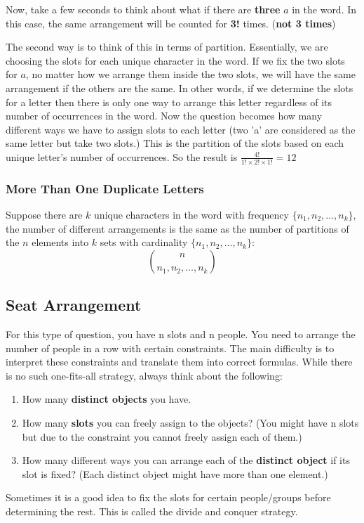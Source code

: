 \documentclass[11pt]{article}
\begin{document}
Now, take a few seconds to think about what if there are \textbf{three} $a$ in the word.
In this case, the same arrangement will be counted for \textbf{3!} times. (\textbf{not 3 times})

The second way is to think of this in terms of partition. Essentially, we are choosing the slots for each unique character in the word. 
If we fix the two slots for $a$, no matter how we arrange them inside the two slots, we will have the same arrangement if the others are the same.
In other words, if we determine the slots for a letter then there is only one way to arrange this letter regardless of its number of occurrences in the word. 
Now the question becomes how many different ways we have to assign slots to each letter (two 'a' are considered as the same letter but take two slots.)
This is the partition of the slots based on each unique letter's number of occurrences. So the result is $\frac{4!}{1! \times 2! \times 1!} = 12$ 

\subsubsection{More Than One Duplicate Letters}
Suppose there are $k$ unique characters in the word with frequency $\{n_1, n_2, \ldots,n_k\}$, the number of different arrangements is the same as the number of partitions of the $n$ elements into $k$ sets with cardinality $\{n_1, n_2, \ldots,n_k\}$:
$$ {n \choose n_1, n_2, \ldots, n_k} $$

\subsection{Seat Arrangement}
For this type of question, you have n slots and n people. 
You need to arrange the number of people in a row with certain constraints.
The main difficulty is to interpret these constraints and translate them into correct formulas. 
While there is no such one-fits-all strategy, always think about the following:
\begin{enumerate}
  \item How many \textbf{distinct objects} you have.
  \item How many \textbf{slots} you can freely assign to the objects? (You might have n slots but due to the constraint you cannot freely assign each of them.)
  \item How many different ways you can arrange each of the \textbf{distinct object} if its slot is fixed? (Each distinct object might have more than one element.)
\end{enumerate}
Sometimes it is a good idea to fix the slots for certain people/groups before determining the rest. This is called the divide and conquer strategy. 
\end{document}
